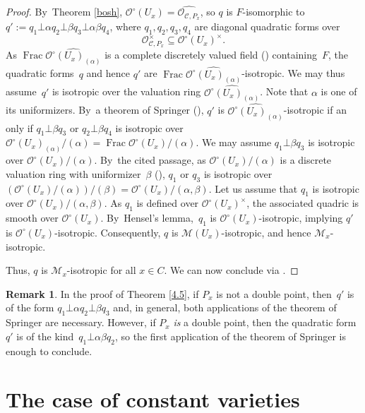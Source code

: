 \documentclass[10pt]{amsart}
\newcommand{\loccit}{the cited passage}
\DeclareMathOperator{\Frac}{Frac}
\theoremstyle{definition}
\newtheorem{rem}[thm]{Remark}
\begin{document}
\begin{proof}
By~Theorem \ref{bosh}, $\mathcal{O}^{\circ}(U_x)\!=\!\widehat{\mathcal{O}_{\mathscr{C}, P_x}}$, so $q$ is $F$-isomorphic to
$
q'\!:=\!q_1 \bot \alpha q_2 \bot \beta q_3 \bot \alpha\beta q_4
$,
where $q_1, q_2, q_3, q_4$ are diagonal quadratic forms over
\[
\mathcal{O}_{\mathscr{C}, P_x}^{\times} \!\subseteq \mathcal{O}^{\circ}(U_x)^{\times}.
\]
As $\Frac \widehat{\mathcal{O}^{\circ}(U_x)_{(\alpha)}}$ is a complete discretely valued field (\cite[Tag\,0AFS]{stacks}) containing~$F$, the quadratic forms~$q$ and hence $q'$ are $\Frac \widehat{\mathcal{O}^{\circ}(U_x)_{(\alpha)}}$-isotropic.
We may thus assu\-me~$q'$ is isotropic over the valuation ring $\widehat{\mathcal{O}^{\circ}(U_x)_{(\alpha)}}$. Note that $\alpha$ is one of its uniformizers. By~a theorem of Springer (\cite[VI, Prop.\,1.9]{lam}), $q'$ is $\widehat{\mathcal{O}^{\circ}(U_x)_{(\alpha)}}$-isotropic if an only if $q_1 \bot \beta q_3$ or $q_2 \bot \beta q_4$ is isotropic over $\mathcal{O}^{\circ}(U_x)_{(\alpha)}/(\alpha)=\Frac \mathcal{O}^{\circ}(U_x)/(\alpha)$. We may assume $q_1 \bot \beta q_3$ is isotropic over $\mathcal{O}^{\circ}(U_x)/(\alpha)$. By~\loccit, as $\mathcal{O}^{\circ}(U_x)/(\alpha)$ is a discrete valuation ring with uniformizer~$\beta$ (\cite[Tag\,00NQ]{stacks}), $q_1$ or $q_3$ is isotropic over $(\mathcal{O}^{\circ}(U_x)/(\alpha))/(\beta)=\mathcal{O}^{\circ}(U_x)/(\alpha, \beta)$. Let us assume that $q_1$ is isotropic over $\mathcal{O}^{\circ}(U_x)/(\alpha, \beta)$. As $q_1$ is defined over $\mathcal{O}^{\circ}(U_x)^{\times}$, the associated quadric is smooth over $\mathcal{O}^{\circ}(U_x)$. By~Hensel's lemma,~$q_1$ is $\mathcal{O}^{\circ}(U_x)$-isotropic, implying $q'$ is $\mathcal{O}^{\circ}(U_x)$-isotropic. Consequently, $q$ is $\mathscr{M}(U_x)$-isotropic, and hence $\mathscr{M}_x$-isotropic.

Thus, $q$ is $\mathscr{M}_x$-isotropic for all $x \in C$. We can now conclude via \cite[Th.\,3.12]{une}.
\end{proof}

\begin{rem}\label{4.6}
In the proof of Theorem \ref{4.5}, if $P_x$ is not a double point, then~$q'$ is of the form $q_1 \bot \alpha q_2 \bot \beta q_3$ and, in general, both applications of the theorem of Springer are necessary. However, if $P_x$ \emph{is} a double point, then the quadratic form $q'$ is of the kind~$q_1 \bot \alpha \beta q_2$, so the first application of the theorem of Springer is enough to conclude.
\end{rem}

\section{The case of constant varieties} \label{seksioni5}
\end{document}

